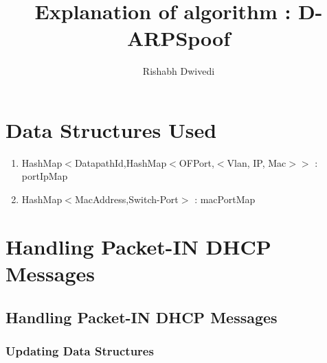 \documentclass{article}
\author{Rishabh Dwivedi}
\title{Explanation of algorithm : D-ARPSpoof}
\renewcommand{\maketitle}{

	\begin{center}
		{\huge\noindent\ignorespaces\textbf{\thetitle}\par}
	\end{center}
	\vspace{0.3in}
	
}
\begin{document}
\maketitle
\section{Data Structures Used}
\begin{enumerate}
	\item HashMap$<$DatapathId,HashMap$<$OFPort,$<$Vlan, IP, Mac$>$$>$ : portIpMap
	\item HashMap$<$MacAddress,Switch-Port$>$ : macPortMap
\end{enumerate}

\section{Handling Packet-IN DHCP Messages}

\subsection{Handling Packet-IN DHCP Messages}

\subsubsection{Updating Data Structures}
\end{document}
